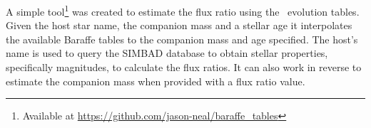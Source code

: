 \documentclass[fleqn,usenatbib]{mnras}
\begin{document}
    A simple tool\footnote{Available at \url{https://github.com/jason-neal/baraffe_tables}} was created to estimate the flux ratio using the~\citep{baraffe_evolutionary_2003,baraffe_new_2015} evolution tables. Given the host star name, the companion mass and a stellar age it interpolates the available Baraffe tables to the companion mass and age specified. The host's name is used to query the SIMBAD database to obtain stellar properties, specifically magnitudes, to calculate the flux ratios. It can also work in reverse to estimate the companion mass when provided with a flux ratio value.




\bsp{}	%
\label{lastpage}
\end{document}
